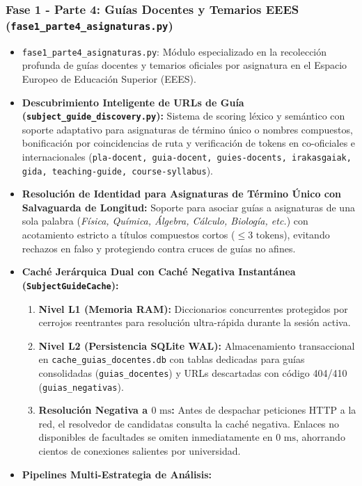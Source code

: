 \subsubsection{Fase 1 - Parte 4: Guías Docentes y Temarios EEES (\texttt{fase1\_parte4\_asignaturas.py})}
\begin{itemize}
    \item \texttt{fase1\_parte4\_asignaturas.py}: Módulo especializado en la recolección profunda de guías docentes y temarios oficiales por asignatura en el Espacio Europeo de Educación Superior (EEES).
    \item \textbf{Descubrimiento Inteligente de URLs de Guía (\texttt{subject\_guide\_discovery.py}):} Sistema de scoring léxico y semántico con soporte adaptativo para asignaturas de término único o nombres compuestos, bonificación por coincidencias de ruta y verificación de tokens en co-oficiales e internacionales (\texttt{pla-docent, guia-docent, guies-docents, irakasgaiak, gida, teaching-guide, course-syllabus}).
    \item \textbf{Resolución de Identidad para Asignaturas de Término Único con Salvaguarda de Longitud:} Soporte para asociar guías a asignaturas de una sola palabra (\emph{Física, Química, Álgebra, Cálculo, Biología, etc.}) con acotamiento estricto a títulos compuestos cortos ($\le 3\text{ tokens}$), evitando rechazos en falso y protegiendo contra cruces de guías no afines.
    \item \textbf{Caché Jerárquica Dual con Caché Negativa Instantánea (\texttt{SubjectGuideCache}):}
    \begin{enumerate}
        \item \textbf{Nivel L1 (Memoria RAM):} Diccionarios concurrentes protegidos por cerrojos reentrantes para resolución ultra-rápida durante la sesión activa.
        \item \textbf{Nivel L2 (Persistencia SQLite WAL):} Almacenamiento transaccional en \texttt{cache\_guias\_docentes.db} con tablas dedicadas para guías consolidadas (\texttt{guias\_docentes}) y URLs descartadas con código 404/410 (\texttt{guias\_negativas}).
        \item \textbf{Resolución Negativa a $0\text{ ms}$:} Antes de despachar peticiones HTTP a la red, el resolvedor de candidatas consulta la caché negativa. Enlaces no disponibles de facultades se omiten inmediatamente en $0\text{ ms}$, ahorrando cientos de conexiones salientes por universidad.
    \end{enumerate}
    \item \textbf{Pipelines Multi-Estrategia de Análisis:}

\end{itemize}
